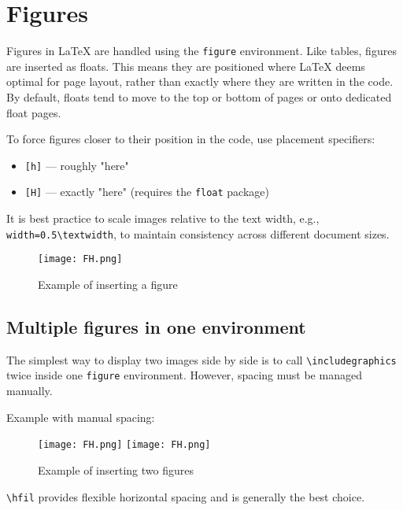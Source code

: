 \section{Figures}
    \label{sec:Figures}

    Figures in \LaTeX{} are handled using the \texttt{figure} environment. Like tables, figures are inserted as floats. This means they are positioned where \LaTeX{} deems optimal for page layout, rather than exactly where they are written in the code. By default, floats tend to move to the top or bottom of pages or onto dedicated float pages.

    To force figures closer to their position in the code, use placement specifiers:
    \begin{itemize}
        \item \texttt{[h]} — roughly "here"
        \item \texttt{[H]} — exactly "here" (requires the \texttt{float} package)
    \end{itemize}

    It is best practice to scale images relative to the text width, e.g., \verb|width=0.5\textwidth|, to maintain consistency across different document sizes.

    \begin{figure}[h]
    	\centering
    	\texttt{[image: FH.png]}
    	\caption{Example of inserting a figure}
    	\label{fig:ExampleFigure-1}
    \end{figure}

\subsection{Multiple figures in one environment}

    The simplest way to display two images side by side is to call \verb|\includegraphics| twice inside one \texttt{figure} environment. However, spacing must be managed manually.

    Example with manual spacing:

    \begin{figure}[h]
        \centering
        \texttt{[image: FH.png]}
        \hfil
        \texttt{[image: FH.png]}
        \caption{Example of inserting two figures}
        \label{fig:ExampleFigure-2}
    \end{figure}

    \verb|\hfil| provides flexible horizontal spacing and is generally the best choice.

